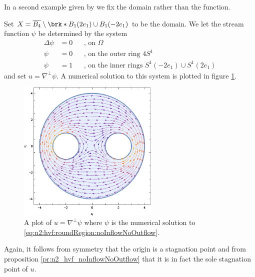 In a second example given by \cite{Wahlen2023} we fix the domain rather than the function.
\begin{example}[No in- or outflow]
  Set $X=\overline{B_4}\setminus\brk*{B_1(2e_1)\cup B_1(-2e_1)}$ to be the domain.
  We let the stream function $\psi$ be determined by the system
  \begin{equation}
    \begin{aligned}
      \Delta \psi&=0 &&\text{, on }\Omega \\
      \psi&=0 &&\text{, on the outer ring }4S^1 \\
      \psi&=1 &&\text{, on the inner rings }S^1(-2e_1)\cup S^1(2e_1)
    \end{aligned}\label{eq:n2:hvf:roundRegion:noInflowNoOutflow}
  \end{equation}
  and set $u=\nabla^\perp\psi$.
  A numerical solution to this system is plotted in figure \ref{pl:n2_hvf_roundRegion_noInflowNoOutflow}.
  \begin{figure}
    \centering
    \includegraphics[width=0.6\textwidth]{../Plots/HarmonicVectorFields_gr4.eps}
    \caption{A plot of $u=\nabla^\perp\psi$ where $\psi$ is the numerical solution to
    \eqref{eq:n2:hvf:roundRegion:noInflowNoOutflow}.}
    \label{pl:n2_hvf_roundRegion_noInflowNoOutflow}
  \end{figure}
  Again, it follows from symmetry that the origin is a stagnation point and
  from proposition \ref{pr:n2_hvf_noInflowNoOutflow} that it is in fact the sole stagnation point of $u$.
\end{example}

